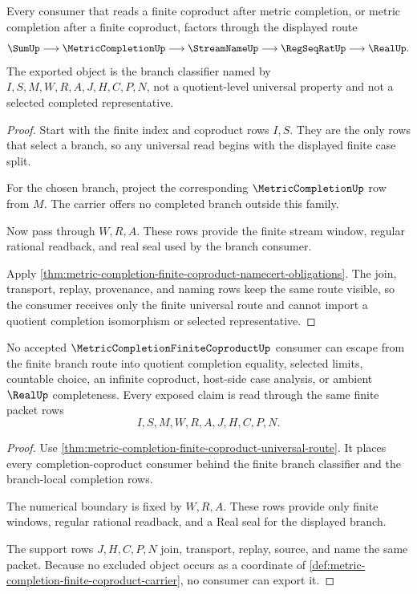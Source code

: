 \begin{theorem}
\label{thm:metric-completion-finite-coproduct-universal-route}
Every consumer that reads a finite coproduct after metric completion, or metric completion after a finite coproduct, factors through the displayed route
$$
\SumUp \longrightarrow \MetricCompletionUp \longrightarrow \StreamNameUp \longrightarrow \RegSeqRatUp \longrightarrow \RealUp .
$$
The exported object is the branch classifier named by $I,S,M,W,R,A,J,H,C,P,N$, not a quotient-level universal property and not a selected completed representative.
\end{theorem}
\begin{proof}
Start with the finite index and coproduct rows $I,S$. They are the only rows that select a branch, so any universal read begins with the displayed finite case split.

For the chosen branch, project the corresponding $\MetricCompletionUp$ row from $M$. The carrier offers no completed branch outside this family.

Now pass through $W,R,A$. These rows provide the finite stream window, regular rational readback, and real seal used by the branch consumer.

Apply \autoref{thm:metric-completion-finite-coproduct-namecert-obligations}. The join, transport, replay, provenance, and naming rows keep the same route visible, so the consumer receives only the finite universal route and cannot import a quotient completion isomorphism or selected representative.
\end{proof}

\begin{theorem}
\label{thm:metric-completion-finite-coproduct-nonescape}
No accepted $\MetricCompletionFiniteCoproductUp$ consumer can escape from the finite branch route into quotient completion equality, selected limits, countable choice, an infinite coproduct, host-side case analysis, or ambient $\RealUp$ completeness. Every exposed claim is read through the same finite packet rows
$$
I,S,M,W,R,A,J,H,C,P,N .
$$
\end{theorem}
\begin{proof}
Use \autoref{thm:metric-completion-finite-coproduct-universal-route}. It places every completion-coproduct consumer behind the finite branch classifier and the branch-local completion rows.

The numerical boundary is fixed by $W,R,A$. These rows provide only finite windows, regular rational readback, and a Real seal for the displayed branch.

The support rows $J,H,C,P,N$ join, transport, replay, source, and name the same packet. Because no excluded object occurs as a coordinate of \autoref{def:metric-completion-finite-coproduct-carrier}, no consumer can export it.
\end{proof}

